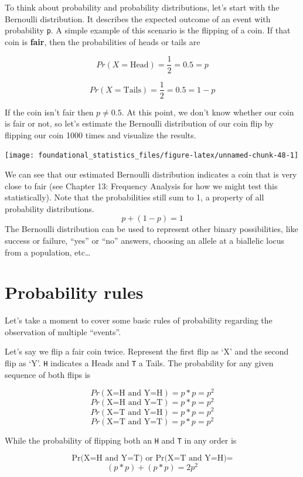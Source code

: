 \documentclass[]{book}
\begin{document}
To think about probability and probability distributions, let's start with the Bernoulli distribution. It describes the expected outcome of an event with probability \texttt{p}. A simple example of this scenario is the flipping of a coin. If that coin is \textbf{fair}, then the probabilities of heads or tails are

\[Pr(X=\text{Head}) = \frac{1}{2} = 0.5 = p \]

\[Pr(X=\text{Tails}) = \frac{1}{2} = 0.5 = 1 - p \]

If the coin isn't fair then \(p \neq 0.5\). At this point, we don't know whether our coin is fair or not, so let's estimate the Bernoulli distribution of our coin flip by flipping our coin 1000 times and visualize the results.

\begin{center}\texttt{[image: foundational\_statistics\_files/figure-latex/unnamed-chunk-48-1]} \end{center}

We can see that our estimated Bernoulli distribution indicates a coin that is very close to fair (see Chapter 13: Frequency Analysis for how we might test this statistically). Note that the probabilities still sum to 1, a property of all probability distributions.
\[ p + (1-p) = 1 \]
The Bernoulli distribution can be used to represent other binary possibilities, like success or failure, ``yes'' or ``no'' answers, choosing an allele at a biallelic locus from a population, etc\ldots{}

\hypertarget{probability-rules}{%
\section{Probability rules}\label{probability-rules}}

Let's take a moment to cover some basic rules of probability regarding the observation of multiple ``events''.

Let's say we flip a fair coin twice. Represent the first flip as `X' and the second flip as `Y'. \texttt{H} indicates a Heads and \texttt{T} a Tails. The probability for any given sequence of both flips is

\[ Pr(\text{X=H and Y=H}) = p*p = p^2 \]
\[ Pr(\text{X=H and Y=T}) = p*p = p^2 \]
\[ Pr(\text{X=T and Y=H}) = p*p = p^2 \]
\[ Pr(\text{X=T and Y=T}) = p*p = p^2 \]

While the probability of flipping both an \texttt{H} and \texttt{T} in any order is

\[ \text{Pr(X=H and Y=T) or Pr(X=T and Y=H)} = \]
\[ (p*p) + (p*p) = 2p^{2} \]
\end{document}
